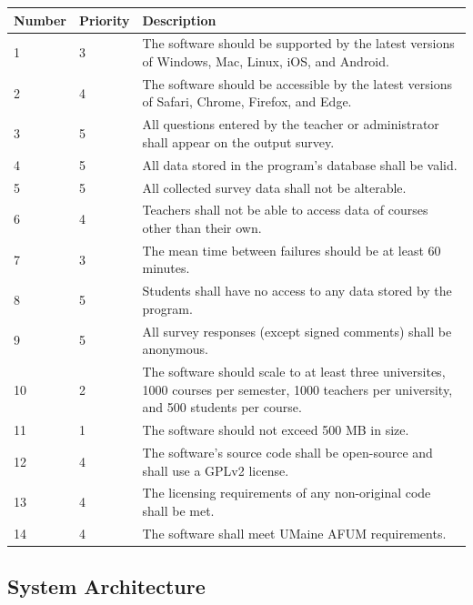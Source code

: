 \documentclass{article}
\begin{document}
\begin{center}
\begin{tabular}{|p{1.5cm}|p{1.5cm}|p{8cm}|}
\hline
\textbf{Number} & \textbf{Priority} & \textbf{Description} \\
\hline
1 & 3 & The software should be supported by the latest versions of Windows, Mac, Linux, iOS, and Android.\\ 
\hline
2 & 4 & The software should be accessible by the latest versions of Safari, Chrome, Firefox, and Edge.\\ 
\hline
3 & 5 & All questions entered by the teacher or administrator shall appear on the output survey.\\  
\hline
4 & 5 & All data stored in the program's database shall be valid.\\
\hline
5 & 5 & All collected survey data shall not be alterable.\\ 
\hline
6 & 4 & Teachers shall not be able to access data of courses other than their own.\\ 
\hline
7 & 3 & The mean time between failures should be at least 60 minutes.\\ 
\hline
8 & 5 & Students shall have no access to any data stored by the program.\\ 
\hline
9 & 5 & All survey responses (except signed \newline comments) shall be anonymous.\\ 
\hline
10 & 2 & The software should scale to at least three universites, 1000 courses per semester, 1000 teachers per university, and 500 students per course.\\  
\hline
11 & 1 & The software should not exceed 500 MB in size.\\
\hline
12 & 4 & The software's source code shall be open-source and shall use a GPLv2 license.\\ 
\hline
13 & 4 & The licensing requirements of any non-original code shall be met.\\ 
\hline
14 & 4 & The software shall meet UMaine AFUM requirements.\\ 
\hline
\end{tabular}
\end{center}

\subsection{System Architecture}
\end{document}
